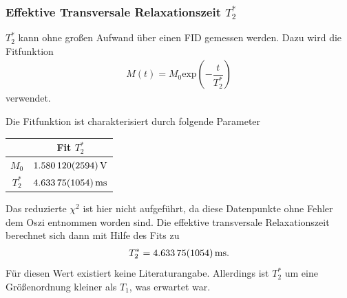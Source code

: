\documentclass[10pt]{article}
\newenvironment{Figure}
  {\par\medskip\noindent\minipage{\linewidth}}
  {\endminipage\par\medskip}
\begin{document}
\begin{multicols}{2}
\subsubsection{Effektive Transversale Relaxationszeit $T_2^*$}
$T_2^*$ kann ohne großen Aufwand über einen FID gemessen werden.
Dazu wird die Fitfunktion
\begin{align} 
        M\left(t\right)=M_0\text{exp}\left(-\dfrac{t}{T_2^*}\right)
\end{align} 
verwendet.
  \begin{Figure}
    \centering\resizebox{\textwidth}{!}{}
    \label{fig:T2eff}
  \end{Figure}
Die Fitfunktion ist charakterisiert durch folgende Parameter
  \begin{center}
    \begin{tabular}{c|c}
    & Fit $T_2^*$\\
    \hline
    $M_0$ & $\SI{1.58012+-0.002594}{V}$ \\
    $T_2^*$ & $\SI{4.63375+-0.01054}{ms}$ 
    \end{tabular}
  \label{Tab:PZG_para}
  \end{center}
Das reduzierte $\chi ^2$ ist hier nicht aufgeführt, da diese Datenpunkte ohne Fehler dem Oszi entnommen worden sind.
Die effektive transversale Relaxationszeit berechnet sich dann mit Hilfe des Fits zu
\begin{align} 
        T_2^*=\SI{4.63375+-0.01054}{ms}
.\end{align} 
Für diesen Wert existiert keine Literaturangabe.
Allerdings ist $T_2^*$ um eine Größenordnung kleiner als $T_1$, was erwartet war.


\end{multicols}
\end{document}
